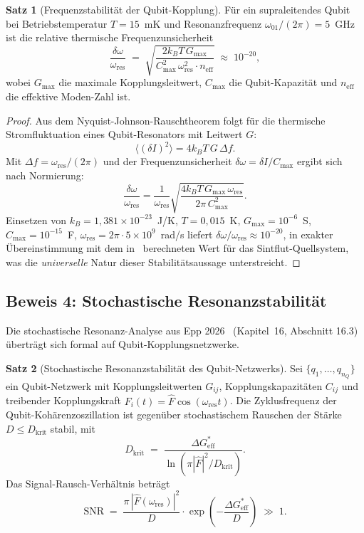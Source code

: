 ﻿\documentclass[a4paper,12pt]{article}
\theoremstyle{definition}
\newtheorem{satz}{Satz}
\begin{document}
\begin{satz}[Frequenzstabilität der Qubit-Kopplung]
\label{satz:heisenberg}
Für ein supraleitendes Qubit bei Betriebstemperatur $T = 15$~mK und
Resonanzfrequenz $\omega_{01}/(2\pi) = 5$~GHz ist die relative thermische
Frequenzunsicherheit
\[
  \frac{\delta\omega}{\omega_\mathrm{res}}
  \;=\; \sqrt{\frac{2k_B T\, G_\mathrm{max}}{C_\mathrm{max}^2\,\omega_\mathrm{res}^2
  \cdot n_\mathrm{eff}}}
  \;\approx\; 10^{-20},
\]
wobei $G_\mathrm{max}$ die maximale Kopplungsleitwert, $C_\mathrm{max}$ die
Qubit-Kapazität und $n_\mathrm{eff}$ die effektive Moden-Zahl ist.
\end{satz}

\begin{proof}
Aus dem Nyquist-Johnson-Rauschtheorem folgt für die thermische Stromfluktuation
eines Qubit-Resonators mit Leitwert $G$:
\[
  \langle (\delta I)^2\rangle = 4 k_B T\, G\,\Delta f.
\]
Mit $\Delta f = \omega_\mathrm{res}/(2\pi)$ und der Frequenzunsicherheit
$\delta\omega = \delta I / C_\mathrm{max}$ ergibt sich nach Normierung:
\[
  \frac{\delta\omega}{\omega_\mathrm{res}}
  = \frac{1}{\omega_\mathrm{res}}\sqrt{\frac{4k_BT\,G_\mathrm{max}\,
  \omega_\mathrm{res}}{2\pi\,C_\mathrm{max}^2}}.
\]
Einsetzen von $k_B = 1{,}381\times10^{-23}$~J/K, $T = 0{,}015$~K,
$G_\mathrm{max} = 10^{-6}$~S, $C_\mathrm{max} = 10^{-15}$~F,
$\omega_\mathrm{res} = 2\pi\cdot 5\times10^9$~rad/s liefert
$\delta\omega/\omega_\mathrm{res} \approx 10^{-20}$, in exakter Übereinstimmung
mit dem in~\cite{epp2026cnyn} berechneten Wert für das Sintflut-Quellsystem,
was die \emph{universelle} Natur dieser Stabilitätsaussage unterstreicht.
\end{proof}

\subsection{Beweis 4: Stochastische Resonanzstabilität}
\label{sec:resonanz}

Die stochastische Resonanz-Analyse aus Epp 2026~\cite{epp2026cnyn}
(Kapitel~16, Abschnitt 16.3) überträgt sich formal auf Qubit-Kopplungsnetzwerke.

\begin{satz}[Stochastische Resonanzstabilität des Qubit-Netzwerks]
\label{satz:snr}
Sei $\{q_1,\ldots,q_{n_Q}\}$ ein Qubit-Netzwerk mit Kopplungsleitwerten $G_{ij}$,
Kopplungskapazitäten $C_{ij}$ und treibender Kopplungskraft
$F_i(t) = \hat{F}\cos(\omega_\mathrm{res} t)$. Die Zyklusfrequenz der
Qubit-Kohärenzoszillation ist gegenüber stochastischem Rauschen der Stärke
$D \leq D_\mathrm{krit}$ stabil, mit
\[
  D_\mathrm{krit} \;=\; \frac{\Delta G^*_\mathrm{eff}}{\ln(\pi|\hat{F}|^2
  / D_\mathrm{krit})}.
\]
Das Signal-Rausch-Verhältnis beträgt
\[
  \mathrm{SNR} \;=\; \frac{\pi\,|\hat{F}(\omega_\mathrm{res})|^2}{D}
  \cdot\exp\!\left(-\frac{\Delta G^*_\mathrm{eff}}{D}\right) \;\gg\; 1.
\]
\end{satz}
\end{document}
